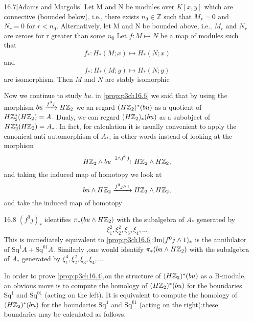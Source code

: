 \documentclass[../main]{subfiles}
\begin{document}
\begin{customlemma}{16.7}[Adams and Margolis] \label{lem:p3ch16.7}
 Let M and N be modules over $K[x,y]$ which are connective (bounded below), i.e., there exists $n_{0} \in \mathbb{Z}$ such that $M_{r}=0$ and $N_{r}=0$ for $r<n_{0}$. Alternatively, let M and N be bounded above, i.e., $M_{r}$ and $N_{r}$ are zeroes for r greater than some $n_{0}$ Let $f:M\mapsto N$ be a map of modules such that \begin{equation*}
     f_{\ast}:H_{\ast}(M;x)\mapsto H_{\ast}(N;x) 
 \end{equation*}
 and \begin{equation*}
      f_{\ast}:H_{\ast}(M;y)\mapsto H_{\ast}(N;y) 
 \end{equation*}
 are isomorphism. Then $M$ and $N$ are stably isomorphic
\end{customlemma}

Now we continue to study $bu$. in \ref{prop:p3ch16.6} we said that by using the morphism $bu \vra{f^0j} H\bZ_2$ we an regard $(H\mathbb{Z}_2)^{\ast}(bu)$ as a quotient of $H\mathbb{Z}_2^{\ast}(H\mathbb{Z}_2)=A.$ Dualy, we can regard $(H\mathbb{Z}_2)_{\ast}(bu) $ as a subobject of $H\mathbb{Z}_2^{\ast}(H\mathbb{Z}_2)=A_{\ast}$. In fact, for calculation it is usually convenient to apply the canonical anti-automorphism of $A_{\ast}$; in other words instead of looking at the morphism \begin{equation*}
    H\bZ_2\wedge bu\vra{1 \wedge f^{0}j} H\bZ_2 \wedge H\bZ_2, 
\end{equation*}
and taking the induced map of homotopy we look at \begin{equation*}
    bu\wedge H\bZ_2 \vra{f^{0}j \wedge1 } H\bZ_2 \wedge H\bZ_2, 
\end{equation*}
and take the induced map of homotopy 
\begin{customlemma}{16.8} \label{lem:p3ch16.8}
 $(f^{0}j)_{\ast}$ identifies $\pi_{\ast}(bu \wedge H\mathbb{Z}_2)$ with the subalgebra of $A_{\ast}$ generated by \begin{equation*}
     \xi_{1}^{2},\xi_{2}^{2},\xi_{3},\xi_{4},\dots
 \end{equation*}
 This is immediately equivalent to \ref{prop:p3ch16.6};$\mathop{\mathrm{Im}}(f^{0}j\wedge1)_{\ast}$ is the annihilator of $\mathrm{Sq}^{1}A+\mathrm{Sq}^{01}A.$
 Similarly ,one would identify $\pi_{\ast}(bu \wedge H\mathbb{Z}_2)$ with the subalgebra of $A_{\ast}$ generated by $\xi_{1}^{4},\xi_{2}^{2},\xi_{3},\xi_{4},\dots$
\end{customlemma}
In order to prove \ref{prop:p3ch16.4},on the structure of $(H\mathbb{Z}_2)^{\ast}(bu)$ as a B-module, an obvious move is to compute the homology of $(H\mathbb{Z}_2)^{\ast}(bu)$ for the boundaries $\mathrm{Sq}^{1}$ and $\mathrm{Sq}^{01}$ (acting on the left). It is equivalent to compute the homology of $(H\mathbb{Z}_2)^{\ast}(bu)$ for the boundaries $\mathrm{Sq}^{1}$ and $\mathrm{Sq}^{01}$ (acting on the right);these boundaries may be calculated as follows.
\end{document}

